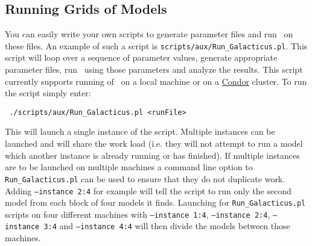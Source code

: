 \subsection{Running Grids of Models}\label{sec:RunningGrids}

You can easily write your own scripts to generate parameter files and run \glc\ on these files. An example of such a script is {\tt scripts/aux/Run\_Galacticus.pl}. This script will loop over a sequence of parameter values, generate appropriate parameter files, run \glc\ using those parameters and analyze the results. This script currently supports running of \glc\ on a local machine or on a \href{http://www.cs.wisc.edu/condor/}{{\sc Condor}} cluster. To run the script simply enter:
\begin{verbatim}
 ./scripts/aux/Run_Galacticus.pl <runFile>
\end{verbatim}
This will launch a single instance of the script. Multiple instances can be launched and will share the work load (i.e. they will not attempt to run a model which another instance is already running or has finished). If multiple instances are to be launched on multiple machines a command line option to {\tt Run\_Galacticus.pl} can be used to ensure that they do not duplicate work. Adding {\tt --instance 2:4} for example will tell the script to run only the second model from each block of four models it finds. Launching for {\tt Run\_Galacticus.pl} scripts on four different machines with {\tt --instance 1:4}, {\tt --instance 2:4}, {\tt --instance 3:4} and {\tt --instance 4:4} will then divide the models between those machines.

